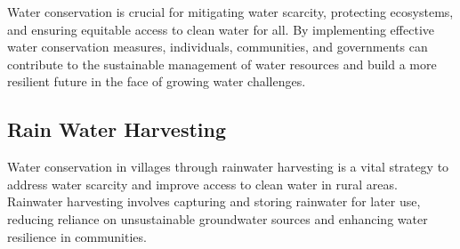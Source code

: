 \documentclass[12pt]{article}
\newcommand{\img}[2]{\scalebox{#1}{\texttt{[image: \#2]}}}
\begin{document}
	\par Water conservation is crucial for mitigating water scarcity, protecting ecosystems, and ensuring equitable access to clean water for all. By implementing effective water conservation measures, individuals, communities, and governments can contribute to the sustainable management of water resources and build a more resilient future in the face of growing water challenges.  \newpage

	\subsection{Rain Water Harvesting}
	\par Water conservation in villages through rainwater harvesting is a vital strategy to address water scarcity and improve access to clean water in rural areas. Rainwater harvesting involves capturing and storing rainwater for later use, reducing reliance on unsustainable groundwater sources and enhancing water resilience in communities.

	\begin{center}
		\img{.935}{Water/harvest_bank.jpg} ~ \img{.5}{Water/harvest_roof.jpg}
	\end{center}
\end{document}
